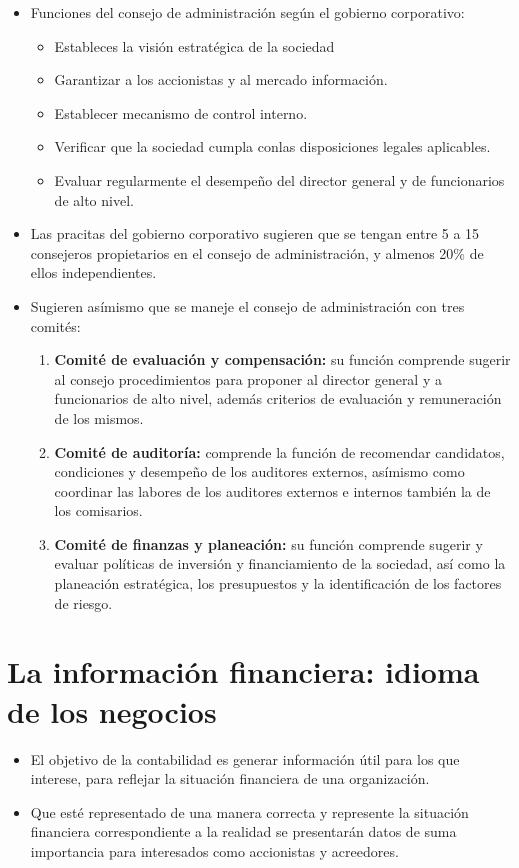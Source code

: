 \documentclass{article}
\begin{document}
\begin{itemize}
    
    \item Funciones del consejo de administración según el gobierno corporativo:
    \begin{itemize}
        \item Estableces la visión estratégica de la sociedad
        \item Garantizar a los accionistas y al mercado información.
        \item Establecer mecanismo de control interno.
        \item Verificar que la sociedad cumpla conlas disposiciones legales aplicables.
        \item Evaluar regularmente el desempeño del director general y de funcionarios de alto nivel.
    \end{itemize}

    
    \item Las pracitas del gobierno corporativo sugieren que se tengan entre 5 a 15 consejeros propietarios en el consejo de administración, y almenos 20\% de ellos independientes.
    \item Sugieren asímismo que se maneje el consejo de administración con tres comités:
    \begin{enumerate}
        \item \textbf{Comité de evaluación y compensación:} su función comprende sugerir al consejo procedimientos para proponer al director general y a funcionarios de alto nivel, además criterios de evaluación y remuneración de los mismos.  
        \item \textbf{Comité de auditoría:} comprende la función de recomendar candidatos, condiciones y desempeño de los auditores externos, asímismo como coordinar las labores de los auditores externos e internos también la de los comisarios.
        \item \textbf{Comité de finanzas y planeación:} su función comprende sugerir y evaluar políticas de inversión y financiamiento de la sociedad, así como la planeación estratégica, los presupuestos y la identificación de los factores de riesgo.
    \end{enumerate}
\end{itemize}

\section{La información financiera: idioma de los negocios}
\begin{itemize}
    \item El objetivo de la contabilidad es generar información útil para los que interese, para reflejar la situación financiera de una organización.
    \item Que esté representado de una manera correcta y represente la situación financiera correspondiente a la realidad se presentarán datos de suma importancia para interesados como accionistas y acreedores.
\end{itemize}
\end{document}

